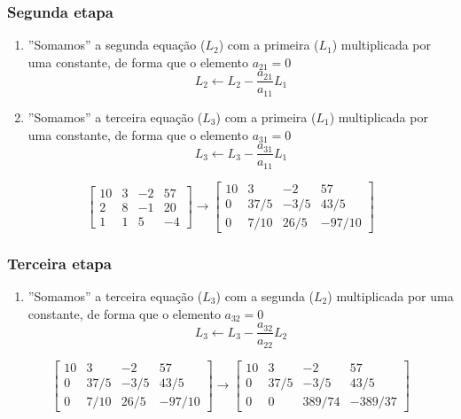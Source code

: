 \begin{frame}
    \frametitle{Segunda etapa}

    \begin{enumerate}
        \item ''Somamos'' a segunda equação (\(L_2\)) com a primeira (\(L_1\)) multiplicada por uma constante, de forma que o elemento \(a_{21} = 0\)
            \[
                L_2 \leftarrow L_2 - \frac{a_{21}}{a_{11}} L_1
            \]
        \item ''Somamos'' a terceira equação (\(L_3\)) com a primeira (\(L_1\)) multiplicada por uma constante, de forma que o elemento \(a_{31} = 0\)
            \[
                L_3 \leftarrow L_3 - \frac{a_{31}}{a_{11}} L_1
            \]
    \end{enumerate}
    \[
        \left[
            \begin{array}{ccc|c}
                10 & 3 & -2 & 57 \\ 2 & 8 & -1 & 20 \\ 1 & 1 & 5 & -4
            \end{array}
        \right]
        \rightarrow
        \left[
            \begin{array}{ccc|c}
                10 & 3 & -2 & 57 \\ 0 & 37/5 & -3/5 & 43/5 \\ 0 & 7/10 & 26/5 & -97/10
            \end{array}
        \right]
    \]
\end{frame}

\begin{frame}
    \frametitle{Terceira etapa}
    \begin{enumerate}
        \item ''Somamos'' a terceira equação (\(L_3\)) com a segunda (\(L_2\)) multiplicada por uma constante, de forma que o elemento \(a_{32} = 0\)
            \[
                L_3 \leftarrow L_3 - \frac{a_{32}}{a_{22}} L_2
            \]
    \end{enumerate}
    \[
        \left[
            \begin{array}{ccc|c}
                10 & 3 & -2 & 57 \\ 0 & 37/5 & -3/5 & 43/5 \\ 0 & 7/10 & 26/5 & -97/10
            \end{array}
        \right]
        \rightarrow
        \left[
            \begin{array}{ccc|c}
                10 & 3 & -2 & 57 \\ 0 & 37/5 & -3/5 & 43/5 \\ 0 & 0 & 389/74 & -389/37
            \end{array}
        \right]
    \]
\end{frame}

